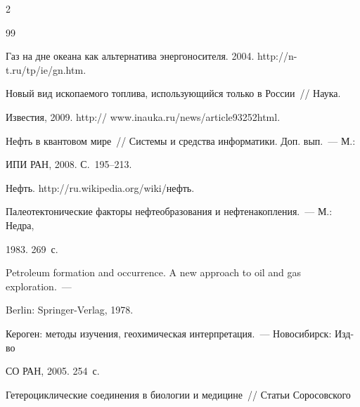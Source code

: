 \begin{multicols}{2}
{{\begin{thebibliography}{99}

Газ на дне океана как альтернатива энергоносителя. 2004. {\sf http://n-t.ru/tp/ie/gn.htm}.




Новый вид ископаемого топлива, использующийся только в России~// Наука. 

Известия, 2009. {\sf  http:// www.inauka.ru/news/article93252html}.





Нефть в квантовом мире~// Системы и средства информатики. Доп. вып.~--- М.: 

ИПИ РАН, 2008. С.~195--213.




Нефть. {\sf http://ru.wikipedia.org/wiki/нефть}.









Палеотектонические факторы нефтеобразования и нефтенакопления.~--- М.: Недра, 

1983.  269~с.





Petroleum formation and occurrence. A new approach to oil and gas exploration.~--- 

Berlin: Springer-Verlag, 1978. 

     



Кероген: методы изучения, геохимическая интерпретация.~--- Новосибирск: Изд-во 

СО РАН, 2005.  254~с.





Гетероциклические соединения в биологии и медицине~// Статьи Соросовского 


\end{thebibliography}}}
\end{multicols}
